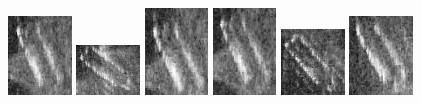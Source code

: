 \begin{figure}
    \includegraphics[width=0.15\textwidth]{chapters/images/dataset/all-class-images/bottle/bottle-338.jpg}
    \includegraphics[width=0.15\textwidth]{chapters/images/dataset/all-class-images/bottle/bottle-63.jpg}
    \includegraphics[width=0.15\textwidth]{chapters/images/dataset/all-class-images/bottle/bottle-412.jpg}
    \includegraphics[width=0.15\textwidth]{chapters/images/dataset/all-class-images/bottle/bottle-378.jpg}
    \includegraphics[width=0.15\textwidth]{chapters/images/dataset/all-class-images/bottle/bottle-152.jpg}
    \includegraphics[width=0.15\textwidth]{chapters/images/dataset/all-class-images/bottle/bottle-254.jpg}
    

\end{figure}
